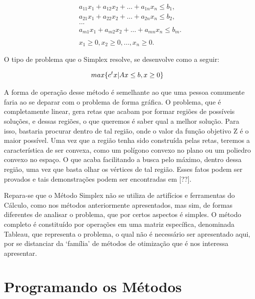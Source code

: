 \begin{equation}
    \begin{array}{ccc}
        &   a_{11}x_1 + a_{12}x_2 + … + a_{1n}x_n \leq b_1,\\
        &   a_{21}x_1 + a_{22}x_2 + … + a_{2n}x_n \leq b_2,\\
        &   ...\\
        &   a_{m1}x_1 + a_{m2}x_2 + … + a_{mn}x_n \leq b_m.\\\\
        &   x_1 \geq 0, x_2 \geq 0, …, x_n \geq 0.
    \end{array}
\end{equation}

O tipo de problema que o Simplex resolve, se desenvolve como a seguir:

\begin{equation}
        max \{c^tx | Ax \leq b, x \geq 0\}\\
\end{equation}


A forma de operação desse método é semelhante ao que uma pessoa comumente
faria ao se deparar com o problema de forma gráfica. O problema, que é
completamente linear, gera retas que acabam por formar regiões de
possíveis soluções, e dessas regiões, o que queremos é saber qual a melhor
solução. Para isso, bastaria procurar dentro de tal região, onde o valor da
função objetivo Z é o maior possível. Uma vez que a região tenha sido
construída pelas retas, teremos a característica de ser convexa, como um
polígono convexo no plano ou um poliedro convexo no espaço. O que acaba
facilitando a busca pelo máximo, dentro dessa região, uma vez que basta olhar
os vértices de tal região. Esses fatos podem ser provados e tais demonstrações
podem ser encontradas em [??].

Repara-se que o Método Simplex não se utiliza de artifícios e ferramentas do
Cálculo, como nos métodos anteriormente apresentados, mas sim, de formas
diferentes de analisar o problema, que por certos aspectos é simples. O método
completo é constituído por operações em uma matriz específica, denominada
Tableau, que representa o problema, o qual não é necessário ser apresentado
aqui, por se distanciar da `família' de métodos de otimização que é nos
interessa apresentar.


\section{{Programando os Métodos}}


